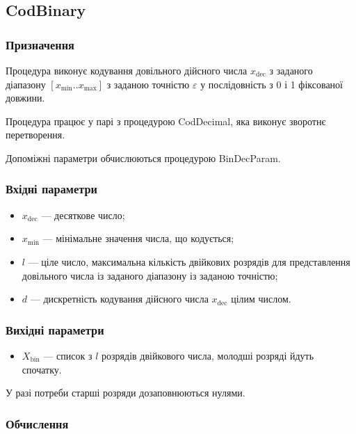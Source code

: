 \documentclass[a4paper, 12pt]{article}
\numberwithin{equation}{section}
\begin{document}
\subsection{CodBinary}

\subsubsection{Призначення}

Процедура виконує кодування довільного дійсного числа $x_{\text{dec}}$ з заданого діапазону $[x_{\text{min}}..x_{\text{max}}]$ з заданою точністю $\varepsilon$ у послідовність з 0 і 1 фіксованої довжини. \medskip

Процедура працює у парі з процедурою CodDecimal, яка виконує зворотнє перетворення. \medskip

Допоміжні параметри обчислюються процедурою BinDecParam.

\subsubsection{Вхідні параметри}

\begin{itemize}
    \item $x_{\text{dec}}$ --- десяткове число;
    \item $x_{\text{min}}$ --- мінімальне значення числа, що кодується;
    \item $l$ --- ціле число, максимальна кількість двійкових розрядів для представлення довільного числа із заданого діапазону із заданою точністю;
    \item $d$ --- дискретність кодування дійсного числа $x_{\text{dec}}$ цілим числом.
\end{itemize}

\subsubsection{Вихідні параметри}

\begin{itemize}
    \item $X_{\text{bin}}$ --- список з $l$ розрядів двійкового числа, молодші розряді йдуть спочатку. 
\end{itemize}

У разі потреби старші розряди дозаповнюються нулями.

\subsubsection{Обчислення}
\end{document}
